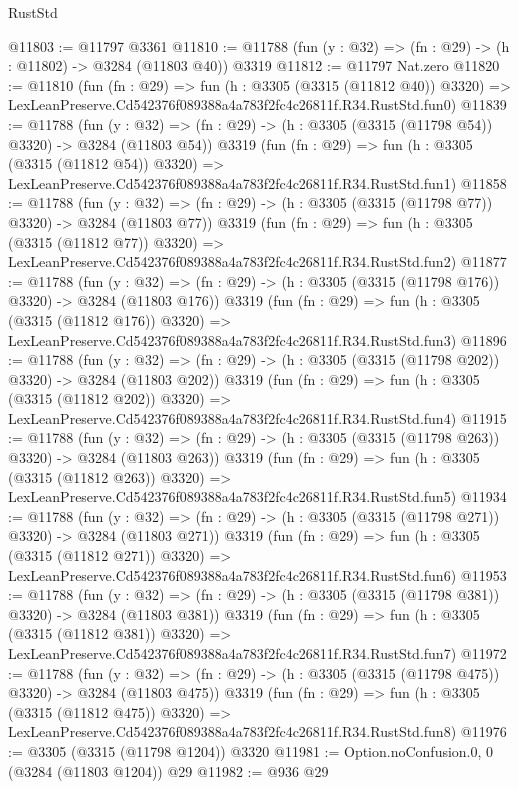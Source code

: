 \begin{lexlean}{RustStd}
\begin{coremodule}
@11803 := @11797 @3361
@11810 := @11788 (fun (y : @32) => (fn : @29) -> (h : @11802) -> @3284 (@11803 @40)) @3319
@11812 := @11797 Nat.zero
@11820 := @11810
    (fun (fn : @29) =>
    fun (h : @3305 (@3315 (@11812 @40)) @3320) =>
    LexLeanPreserve.Cd542376f089388a4a783f2fc4c26811f.R34.RustStd.fun0)
@11839 := @11788
    (fun (y : @32) => (fn : @29) -> (h : @3305 (@3315 (@11798 @54)) @3320) -> @3284 (@11803 @54))
    @3319
    (fun (fn : @29) =>
    fun (h : @3305 (@3315 (@11812 @54)) @3320) =>
    LexLeanPreserve.Cd542376f089388a4a783f2fc4c26811f.R34.RustStd.fun1)
@11858 := @11788
    (fun (y : @32) => (fn : @29) -> (h : @3305 (@3315 (@11798 @77)) @3320) -> @3284 (@11803 @77))
    @3319
    (fun (fn : @29) =>
    fun (h : @3305 (@3315 (@11812 @77)) @3320) =>
    LexLeanPreserve.Cd542376f089388a4a783f2fc4c26811f.R34.RustStd.fun2)
@11877 := @11788
    (fun (y : @32) => (fn : @29) -> (h : @3305 (@3315 (@11798 @176)) @3320) -> @3284 (@11803 @176))
    @3319
    (fun (fn : @29) =>
    fun (h : @3305 (@3315 (@11812 @176)) @3320) =>
    LexLeanPreserve.Cd542376f089388a4a783f2fc4c26811f.R34.RustStd.fun3)
@11896 := @11788
    (fun (y : @32) => (fn : @29) -> (h : @3305 (@3315 (@11798 @202)) @3320) -> @3284 (@11803 @202))
    @3319
    (fun (fn : @29) =>
    fun (h : @3305 (@3315 (@11812 @202)) @3320) =>
    LexLeanPreserve.Cd542376f089388a4a783f2fc4c26811f.R34.RustStd.fun4)
@11915 := @11788
    (fun (y : @32) => (fn : @29) -> (h : @3305 (@3315 (@11798 @263)) @3320) -> @3284 (@11803 @263))
    @3319
    (fun (fn : @29) =>
    fun (h : @3305 (@3315 (@11812 @263)) @3320) =>
    LexLeanPreserve.Cd542376f089388a4a783f2fc4c26811f.R34.RustStd.fun5)
@11934 := @11788
    (fun (y : @32) => (fn : @29) -> (h : @3305 (@3315 (@11798 @271)) @3320) -> @3284 (@11803 @271))
    @3319
    (fun (fn : @29) =>
    fun (h : @3305 (@3315 (@11812 @271)) @3320) =>
    LexLeanPreserve.Cd542376f089388a4a783f2fc4c26811f.R34.RustStd.fun6)
@11953 := @11788
    (fun (y : @32) => (fn : @29) -> (h : @3305 (@3315 (@11798 @381)) @3320) -> @3284 (@11803 @381))
    @3319
    (fun (fn : @29) =>
    fun (h : @3305 (@3315 (@11812 @381)) @3320) =>
    LexLeanPreserve.Cd542376f089388a4a783f2fc4c26811f.R34.RustStd.fun7)
@11972 := @11788
    (fun (y : @32) => (fn : @29) -> (h : @3305 (@3315 (@11798 @475)) @3320) -> @3284 (@11803 @475))
    @3319
    (fun (fn : @29) =>
    fun (h : @3305 (@3315 (@11812 @475)) @3320) =>
    LexLeanPreserve.Cd542376f089388a4a783f2fc4c26811f.R34.RustStd.fun8)
@11976 := @3305 (@3315 (@11798 @1204)) @3320
@11981 := Option.noConfusion.{0, 0} (@3284 (@11803 @1204)) @29
@11982 := @936 @29

\end{coremodule}
\end{lexlean}
